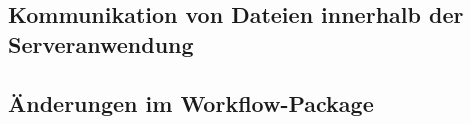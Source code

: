 \subsection{Kommunikation von Dateien innerhalb der Serveranwendung}

\subsection{Änderungen im Workflow-Package}